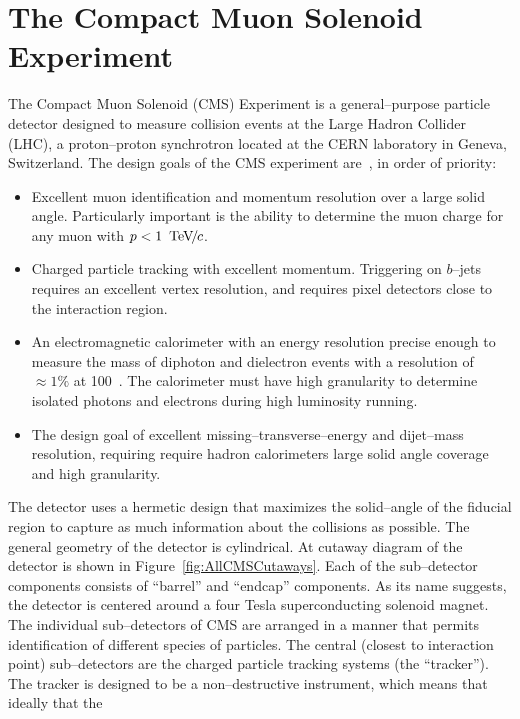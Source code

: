 \ifx\master\undefined\fi
\chapter{The Compact Muon Solenoid Experiment}
\label{ch:detector}
%
%
The Compact Muon Solenoid (CMS) Experiment is a general--purpose particle
detector designed to measure collision events at the Large Hadron Collider
(LHC), a proton--proton synchrotron located at the CERN laboratory in Geneva,
Switzerland.  The design goals of the CMS experiment are~\cite{CMSExperiment},
in order of priority:
\begin{itemize}
  \item  Excellent muon identification and momentum resolution over a large
    solid angle.  Particularly important is the ability to determine the muon
    charge for any muon with $p < 1~{\,\text{Te\hspace{-.08em}V\hspace{-0.16em}/\hspace{-0.08em}}c}$.
  \item Charged particle tracking with excellent momentum.
     Triggering on $b$--jets requires an excellent vertex resolution, and
     requires pixel detectors close to the interaction region.
  \item An electromagnetic calorimeter with an energy resolution precise enough
    to measure the mass of diphoton and dielectron events with a resolution of
    $\approx 1\%$ at 100~\GeVcc.  The calorimeter must have high granularity to
    determine isolated photons and electrons during high luminosity running.
  \item The design goal of excellent missing--transverse--energy and dijet--mass 
    resolution, requiring require hadron calorimeters large solid angle coverage
    and high granularity.
\end{itemize}
The detector uses a hermetic design that maximizes the
solid--angle of the fiducial region to capture as much information about the
collisions as possible.  The general geometry of the detector is cylindrical.
At cutaway diagram of the detector is shown in Figure~\ref{fig:AllCMSCutaways}.
Each of the sub--detector components consists of ``barrel'' and ``endcap''
components.  As its name suggests, the detector is centered around a four Tesla
superconducting solenoid magnet.  The individual sub--detectors of CMS are
arranged in a manner that permits identification of different species of
particles.  The central (closest to interaction point) sub--detectors are the
charged particle tracking systems (the ``tracker'').  The tracker is designed to
be a non--destructive instrument, which means that ideally that the
